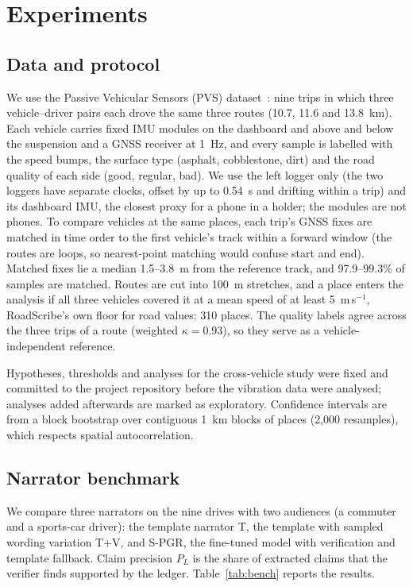 \section{Experiments}
\label{sec:exp}

\subsection{Data and protocol}
\label{sec:data}
We use the Passive Vehicular Sensors (PVS) dataset~\cite{menegazzo2021pvs}: nine trips in which three vehicle--driver pairs each drove the same three routes (10.7, 11.6 and 13.8~km).
Each vehicle carries fixed IMU modules on the dashboard and above and below the suspension and a GNSS receiver at 1~Hz, and every sample is labelled with the speed bumps, the surface type (asphalt, cobblestone, dirt) and the road quality of each side (good, regular, bad).
We use the left logger only (the two loggers have separate clocks, offset by up to 0.54~s and drifting within a trip) and its dashboard IMU, the closest proxy for a phone in a holder; the modules are not phones.
To compare vehicles at the same places, each trip's GNSS fixes are matched in time order to the first vehicle's track within a forward window (the routes are loops, so nearest-point matching would confuse start and end).
Matched fixes lie a median 1.5--3.8~m from the reference track, and 97.9--99.3\% of samples are matched.
Routes are cut into 100~m stretches, and a place enters the analysis if all three vehicles covered it at a mean speed of at least 5~m\,s$^{-1}$, RoadScribe's own floor for road values: 310 places.
The quality labels agree across the three trips of a route (weighted $\kappa=0.93$), so they serve as a vehicle-independent reference.

Hypotheses, thresholds and analyses for the cross-vehicle study were fixed and committed to the project repository before the vibration data were analysed; analyses added afterwards are marked as exploratory.
Confidence intervals are from a block bootstrap over contiguous 1~km blocks of places (2{,}000 resamples), which respects spatial autocorrelation.

\subsection{Narrator benchmark}
\label{sec:bench}
We compare three narrators on the nine drives with two audiences (a commuter and a sports-car driver): the template narrator T, the template with sampled wording variation T+V, and S-PGR, the fine-tuned model with verification and template fallback.
Claim precision $P_L$ is the share of extracted claims that the verifier finds supported by the ledger.
Table~\ref{tab:bench} reports the results.

